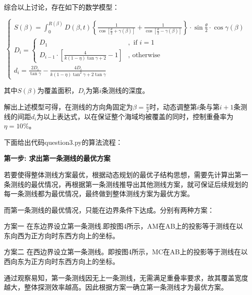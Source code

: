 
综合以上讨论，存在如下的数学模型：

\begin{equation}
    \begin{cases}
        S(\beta) = \int^{R(\beta)}_0 D(\beta, t) \left\{
            \frac{1}{\cos\left[\frac{\theta}{2}+\gamma(\beta)\right]} +
            \frac{1}{\cos\left[\frac{\theta}{2}-\gamma(\beta)\right]}
        \right\} \cdot \sin\frac{\theta}{2} \cdot \cos \gamma(\beta) \\
        D_{i} = \begin{cases}
            D_1                                                                    &, \text{ if } i = 1  \\
            D_{i - 1} \cdot \left[\frac{4}{k(1 - \eta) \tan \gamma + 2} - 1\right] &, \text{ otherwise }
        \end{cases} \\
        d_i = \frac{2D_i}{\tan \gamma} - \frac{4D_i}{k(1-\eta) \tan^2 \gamma + 2 \tan \gamma}
    \end{cases}
\end{equation}

其中$S(\beta)$为覆盖面积，$D_i$为第$i$条测线的深度。

解出上述模型可得，在测线的方向角固定为$\beta = \frac{\pi}{2}$时，动态调整第$i$条与第$i + 1$条测线的间距$d_i$为以上表达式，以在保证整个海域均被覆盖的同时，控制重叠率为$\eta = 10\%$。


下面给出代码question3.py的算法流程：

\textbf{第一步: 求出第一条测线的最优方案}

若要使得整体测线方案最优，根据动态规划的最优子结构思想，需要先计算出第一条测线的最优情况，再根据第一条测线推导出其他测线方案，就可保证后续规划的每一条测线都为最优情况，最终做到整体测线方案为最优方案。

而第一条测线的最优情况，只能在边界条件下达成。分别有两种方案：

方案一 在东边界设立第一条测线.即按图4所示，AM在AB上的投影等于测线在以东向西为正方向时东西方向上的坐标。

方案二 在西边界设立第一条测线。即按图4所示，MC在AB上的投影等于测线在以西向东为正方向时东西方向上的坐标。

通过观察易知，第一条测线因无上一条测线，无需满足重叠率要求，故其覆盖宽度越大，整体探测效率越高。因此根据方案一确立第一条测线才为最优方案。

